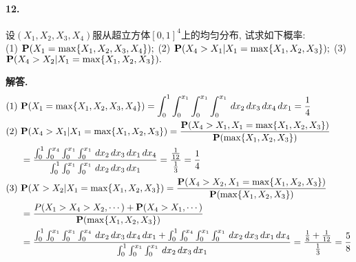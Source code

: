 \documentclass[12pt, a4paper, oneside]{ctexart}
\newenvironment{solution}{\par\noindent\textbf{解答. }}{\bigskip\par}
\begin{document}
\paragraph{12.}设$(X_1,X_2,X_3,X_4)$服从超立方体$[0,1]^4$上的均匀分布, 试求如下概率:\\
(1) $\P(X_1=\max\{X_1,X_2,X_3,X_4\});$ (2) $\P(X_4>X_1|X_1=\max\{X_1,X_2,X_3\});$ (3)$\P(X_4>X_2|X_1=\max\{X_1,X_2,X_3\}).$
\begin{solution}
    \begin{align*}
        (1)&\ \P(X_1=\max\{X_1,X_2,X_3,X_4\}) = \int_0^1\int_0^{x_1}\int_0^{x_1}\int_0^{x_1}\,dx_2\,dx_3\,dx_4\,dx_1=\frac{1}{4}\\
        (2)&\ \P(X_4>X_1|X_1=\max\{X_1,X_2,X_3\}) = \frac{\P(X_4>X_1,X_1=\max\{X_1,X_2,X_3\})}{\P(\max\{X_1,X_2,X_3\})}\\
         &\ =\frac{\int_0^1\int_0^{x_4}\int_0^{x_1}\int_0^{x_1}\,dx_2\,dx_3\,dx_1\,dx_4}{\int_0^1\int_0^{x_1}\int_0^{x_1}\,dx_2\,dx_3\,dx_1} = \frac{\frac{1}{12}}{\frac{1}{3}}=\frac{1}{4}\\
        (3)&\ \P(X>X_2|X_1=\max\{X_1,X_2,X_3\}) = \frac{\P(X_4>X_2,X_1=\max\{X_1,X_2,X_3\})}{\P(\max\{X_1,X_2,X_3\})}\\
         &\ =\frac{P(X_1>X_4>X_2,\cdots)+\P(X_4>X_1,\cdots)}{\P(\max\{X_1,X_2,X_3\})}\\
         &\ =\frac{\int_0^1\int_0^{x_1}\int_0^{x_1}\int_0^{x_4}\,dx_2\,dx_3\,dx_4\,dx_1+\int_0^1\int_0^{x_4}\int_0^{x_1}\int_0^{x_1}\,dx_2\,dx_3\,dx_1\,dx_4}{\int_0^1\int_0^{x_1}\int_0^{x_1}\,dx_2\,dx_3\,dx_1} = \frac{\frac{1}{8}+\frac{1}{12}}{\frac{1}{3}}=\frac{5}{8}
    \end{align*}
\end{solution}
\end{document}
